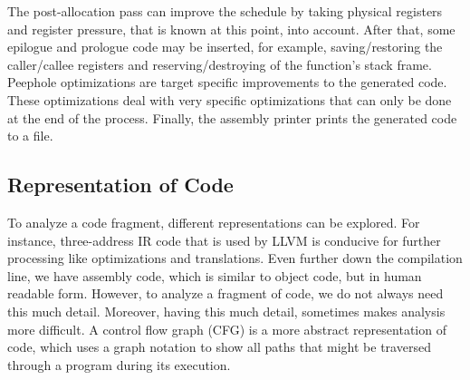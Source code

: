 The post-allocation pass can improve the schedule by taking physical registers and register pressure, that is known at this point, into account. After that, some epilogue and prologue code may be inserted, for example, saving/restoring the caller/callee registers and reserving/destroying of the function's stack frame. Peephole optimizations are target specific improvements to the generated code. These optimizations deal with very specific optimizations that can only be done at the end of the process. Finally, the assembly printer prints the generated code to a file.








\subsection{Representation of Code}
To analyze a code fragment, different representations can be explored. For instance, three-address IR code that is used by LLVM is conducive for further processing like optimizations and translations. Even further down the compilation line, we have assembly code, which is similar to object code, but in human readable form. However, to analyze a fragment of code, we do not always need this much detail. Moreover, having this much detail, sometimes makes analysis more difficult. A control flow graph (CFG) is a more abstract representation of code, which uses a graph notation to show all paths that might be traversed through a program during its execution.  

